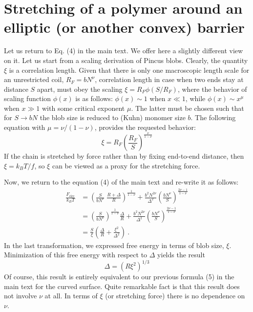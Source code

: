 \documentclass[aps,pre,floatfix,twocolumn,nofootinbib]{revtex4-2}
\newcommand{\be}{\begin{equation}}
\newcommand{\ee}{\end{equation}}
\begin{document}
\section{Stretching of a polymer around an elliptic (or another convex) barrier}\label{app_curved}

Let us return to Eq. (4) in the main text. We offer here a slightly different view on it. Let us start from a scaling derivation of Pincus blobs. Clearly, the quantity $\xi$ is a correlation length. Given that there is only one macroscopic length scale for an unrestricted coil, $R_F = b N^{\nu}$, correlation length in case when two ends stay at distance $S$ apart, must obey the scaling $\xi = R_F \phi (S/R_F)$, where the behavior of scaling function $\phi(x)$ is as follows: $\phi(x) \sim 1$ when $x \ll 1$, while $\phi(x)\sim x^{\mu}$ when $x \gg 1$ with some critical exponent $\mu$. The latter must be chosen such that for $S \to b N$ the blob size is reduced to (Kuhn) monomer size $b$. The following equation with $\mu = \nu / (1-\nu)$, provides the requested behavior:
\be
\xi = R_F \left( \frac{R_F}{S} \right)^{\frac{\nu}{1-\nu}}
\label{eq:xi}
\ee
If the chain is stretched by force rather than by fixing end-to-end distance, then $\xi = k_B T/f$, so $\xi$ can be viewed as a proxy for the stretching force.

Now, we return to the equation (4) of the main text and re-write it as follows:
\be \begin{split}
\frac{F_{\mathrm{circ}}}{k_B T} & = \left(\frac{S}{b N^{\nu}}\; \frac{R+\Delta}{R} \right)^{\frac{1}{1-\nu}} + \frac{b^2 N^{2\nu}}{\Delta^2} \left(\frac{b N^{\nu}}{S} \right)^{\frac{2 \nu -1}{1-\nu}}  \\ &  = \left( \frac{S}{b N^{\nu}} \right)^{\frac{1}{1-\nu}} \frac{\Delta}{R} + \frac{b^2 N^{2\nu}}{\Delta^2} \left(\frac{b N^{\nu}}{S} \right)^{\frac{2\nu-1}{1-\nu}}  \\ & = \frac{S}{\xi} \left(\frac{\Delta}{R} + \frac{\xi^2}{\Delta^2}\right) \ .
\label{eq:free_energy_circle_1}
\end{split}
\ee
In the last transformation, we expressed free energy in terms of blob size, $\xi$.  Minimization of this free energy with respect to $\Delta$ yields the result
\be
\Delta = \left(R \xi^2 \right)^{1/3}
\label{eq:xi2}
\ee
Of course, this result is entirely equivalent to our previous formula (5) in the main text for the curved surface. Quite remarkable fact is that this result does not involve $\nu$ at all. In terms of $\xi$ (or stretching force) there is no dependence on $\nu$.
\end{document}
